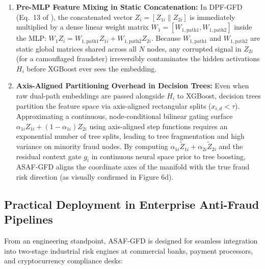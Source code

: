 \documentclass[10pt,a4paper,twocolumn]{article}
\begin{document}
\begin{enumerate}
  \item \textbf{Pre-MLP Feature Mixing in Static Concatenation:} In DPF-GFD (Eq.\ 13 of \cite{ref9}), the concatenated vector $Z_i = [Z_{1i} \parallel Z_{2i}]$ is immediately multiplied by a dense linear weight matrix $W_1 = [W_{1,\text{path1}}, W_{1,\text{path2}}]$ inside the MLP: $W_1 Z_i = W_{1,\text{path1}} Z_{1i} + W_{1,\text{path2}} Z_{2i}$. Because $W_{1,\text{path1}}$ and $W_{1,\text{path2}}$ are static global matrices shared across all $N$ nodes, any corrupted signal in $Z_{2i}$ (for a camouflaged fraudster) irreversibly contaminates the hidden activations $H_i$ before XGBoost ever sees the embedding.
  \item \textbf{Axis-Aligned Partitioning Overhead in Decision Trees:} Even when raw dual-path embeddings are passed alongside $H_i$ to XGBoost, decision trees partition the feature space via axis-aligned rectangular splits ($x_{i,d} < \tau$). Approximating a continuous, node-conditional bilinear gating surface $\alpha_{1i} Z_{1i} + (1 - \alpha_{1i}) Z_{2i}$ using axis-aligned step functions requires an exponential number of tree splits, leading to tree fragmentation and high variance on minority fraud nodes. By computing $\alpha_{1i} \tilde{Z}_{1i} + \alpha_{2i} \tilde{Z}_{2i}$ and the residual context gate $g_i$ in continuous neural space prior to tree boosting, ASAF-GFD aligns the coordinate axes of the manifold with the true fraud risk direction (as visually confirmed in Figure 6d).
\end{enumerate}

\subsection{Practical Deployment in Enterprise Anti-Fraud Pipelines}

From an engineering standpoint, ASAF-GFD is designed for seamless integration into two-stage industrial risk engines at commercial banks, payment processors, and cryptocurrency compliance desks:
\end{document}
